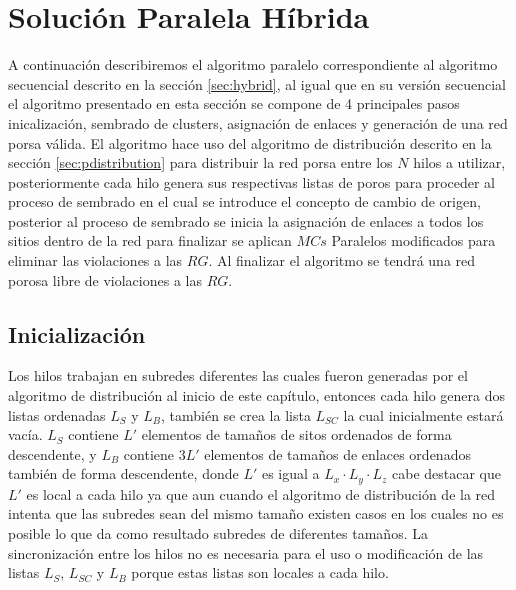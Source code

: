\section{Solución Paralela Híbrida}
\label{sec:ph}
A continuación describiremos el algoritmo paralelo correspondiente al algoritmo secuencial descrito en la secci\'on \ref{sec:hybrid}, al igual que en su versi\'on secuencial el algoritmo presentado en esta secci\'on se compone de 4 principales pasos inicalizaci\'on, sembrado de clusters, asignación de enlaces y generación de una red porsa v\'alida. El algoritmo hace uso del algoritmo de distribución descrito en la sección \ref{sec:pdistribution} para distribuir la red porsa entre los $N$ hilos a utilizar, posteriormente cada hilo genera sus respectivas listas de poros para proceder al proceso de sembrado en el cual se introduce el concepto de cambio de origen, posterior al proceso de sembrado se inicia la asignación de enlaces a todos los sitios dentro de la red para finalizar se aplican $MCs$ Paralelos modificados para eliminar las violaciones a las $RG$. Al finalizar el algoritmo se tendrá una red porosa libre de violaciones a las $RG$.

\subsection{Inicialización}
\label{subsec:pinit}
Los hilos trabajan en subredes diferentes las cuales fueron generadas por el algoritmo de distribución al inicio de este capítulo, entonces cada hilo genera dos listas ordenadas $L_S$ y $L_B$, también se crea la lista $L_{SC}$ la cual inicialmente estará vacía. $L_S$ contiene $L'$ elementos de tamaños de sitos ordenados de forma descendente, y $L_B$ contiene $3L'$ elementos de tamaños de enlaces ordenados también de forma descendente, donde $L'$ es igual a $L_x \cdot L_y \cdot L_z$ cabe destacar que $L'$ es local a cada hilo ya que aun cuando el algoritmo de distribución de la red intenta que las subredes sean del mismo tamaño existen casos en los cuales no es posible lo que da como resultado subredes de diferentes tamaños. La sincronización entre los hilos no es necesaria para el uso o modificación de las listas $L_S$, $L_{SC}$ y $L_B$ porque estas listas son locales a cada hilo.

